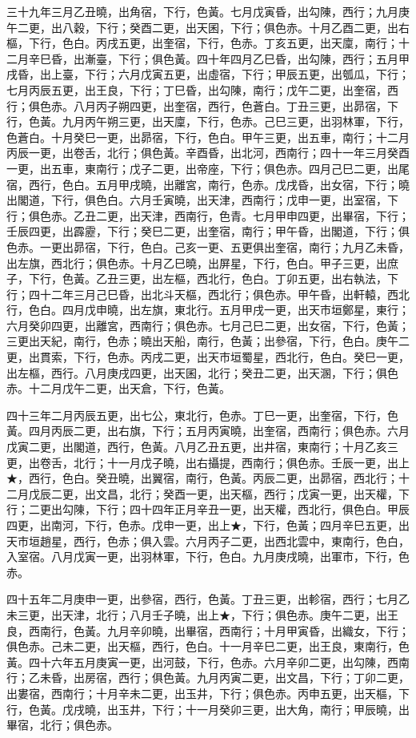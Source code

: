 \begin{pinyinscope}
三十九年三月乙丑曉，出角宿，下行，色黃。七月戊寅昏，出勾陳，西行；九月庚午二更，出八穀，下行；癸酉二更，出天囷，下行；俱色赤。十月乙酉二更，出右樞，下行，色白。丙戌五更，出奎宿，下行，色赤。丁亥五更，出天廩，南行；十二月辛巳昏，出漸臺，下行；俱色黃。四十年四月乙巳昏，出勾陳，西行；五月甲戌昏，出上臺，下行；六月戊寅五更，出虛宿，下行；甲辰五更，出瓠瓜，下行；七月丙辰五更，出王良，下行；丁巳昏，出勾陳，南行；戊午二更，出奎宿，西行；俱色赤。八月丙子朔四更，出奎宿，西行，色蒼白。丁丑三更，出昴宿，下行，色黃。九月丙午朔三更，出天廩，下行，色赤。己巳三更，出羽林軍，下行，色蒼白。十月癸巳一更，出昴宿，下行，色白。甲午三更，出五車，南行；十二月丙辰一更，出卷舌，北行；俱色黃。辛酉昏，出北河，西南行；四十一年三月癸酉一更，出五車，東南行；戊子二更，出帝座，下行；俱色赤。四月己巳二更，出尾宿，西行，色白。五月甲戌曉，出離宮，南行，色赤。戊戌昏，出女宿，下行；曉出閣道，下行，俱色白。六月壬寅曉，出天津，西南行；戊申一更，出室宿，下行；俱色赤。乙丑二更，出天津，西南行，色青。七月甲申四更，出畢宿，下行；壬辰四更，出霹靂，下行；癸巳二更，出奎宿，南行；甲午昏，出閣道，下行；俱色赤。一更出昴宿，下行，色白。己亥一更、五更俱出奎宿，南行；九月乙未昏，出左旗，西北行；俱色赤。十月乙巳曉，出屏星，下行，色白。甲子三更，出庶子，下行，色黃。乙丑三更，出左樞，西北行，色白。丁卯五更，出右執法，下行；四十二年三月己巳昏，出北斗天樞，西北行；俱色赤。甲午昏，出軒轅，西北行，色白。四月戊申曉，出左旗，東北行。五月甲戌一更，出天市垣鄭星，東行；六月癸卯四更，出離宮，西南行；俱色赤。七月己巳二更，出女宿，下行，色黃；三更出天紀，南行，色赤；曉出天船，南行，色黃；出參宿，下行，色白。庚午二更，出貫索，下行，色赤。丙戌二更，出天市垣蜀星，西北行，色白。癸巳一更，出左樞，西行。八月庚戌四更，出天囷，北行；癸丑二更，出天溷，下行；俱色赤。十二月戊午二更，出天倉，下行，色黃。

四十三年二月丙辰五更，出七公，東北行，色赤。丁巳一更，出奎宿，下行，色黃。四月丙辰二更，出右旗，下行；五月丙寅曉，出奎宿，西南行；俱色赤。六月戊寅二更，出閣道，西行，色黃。八月乙丑五更，出井宿，東南行；十月乙亥三更，出卷舌，北行；十一月戊子曉，出右攝提，西南行；俱色赤。壬辰一更，出上★，西行，色白。癸丑曉，出翼宿，南行，色黃。丙辰二更，出昴宿，西北行；十二月戊辰二更，出文昌，北行；癸酉一更，出天樞，西行；戊寅一更，出天權，下行；二更出勾陳，下行；四十四年正月辛丑一更，出天權，西北行，俱色白。甲辰四更，出南河，下行，色赤。戊申一更，出上★，下行，色黃；四月辛巳五更，出天市垣趙星，西行，色赤；俱入雲。六月丙子二更，出西北雲中，東南行，色白，入室宿。八月戊寅一更，出羽林軍，下行，色白。九月庚戌曉，出軍市，下行，色赤。

四十五年二月庚申一更，出參宿，西行，色黃。丁丑三更，出軫宿，西行；七月乙未三更，出天津，北行；八月壬子曉，出上★，下行；俱色赤。庚午二更，出王良，西南行，色黃。九月辛卯曉，出畢宿，西南行；十月甲寅昏，出織女，下行；俱色赤。己未二更，出天樞，西行，色白。十一月辛巳二更，出王良，東南行，色黃。四十六年五月庚寅一更，出河鼓，下行，色赤。六月辛卯二更，出勾陳，西南行；乙未昏，出房宿，西行；俱色黃。九月丙寅二更，出文昌，下行；丁卯二更，出婁宿，西南行；十月辛未二更，出玉井，下行；俱色赤。丙申五更，出天樞，下行，色黃。戊戌曉，出玉井，下行；十一月癸卯三更，出大角，南行；甲辰曉，出畢宿，北行；俱色赤。


\end{pinyinscope}
